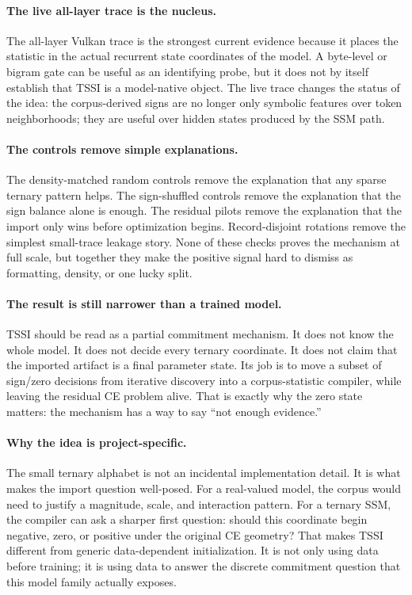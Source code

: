 \documentclass{article}
\begin{document}
\paragraph{The live all-layer trace is the nucleus.}
The all-layer Vulkan trace is the strongest current evidence because it places
the statistic in the actual recurrent state coordinates of the model. A
byte-level or bigram gate can be useful as an identifying probe, but it does not
by itself establish that TSSI is a model-native object. The live trace changes
the status of the idea: the corpus-derived signs are no longer only symbolic
features over token neighborhoods; they are useful over hidden states produced
by the SSM path.

\paragraph{The controls remove simple explanations.}
The density-matched random controls remove the explanation that any sparse
ternary pattern helps. The sign-shuffled controls remove the explanation that
the sign balance alone is enough. The residual pilots remove the explanation
that the import only wins before optimization begins. Record-disjoint rotations
remove the simplest small-trace leakage story. None of these checks proves the
mechanism at full scale, but together they make the positive signal hard to
dismiss as formatting, density, or one lucky split.

\paragraph{The result is still narrower than a trained model.}
TSSI should be read as a partial commitment mechanism. It does not know the
whole model. It does not decide every ternary coordinate. It does not claim that
the imported artifact is a final parameter state. Its job is to move a subset
of sign/zero decisions from iterative discovery into a corpus-statistic
compiler, while leaving the residual CE problem alive. That is exactly why the
zero state matters: the mechanism has a way to say ``not enough evidence.''

\paragraph{Why the idea is project-specific.}
The small ternary alphabet is not an incidental implementation detail. It is
what makes the import question well-posed. For a real-valued model, the corpus
would need to justify a magnitude, scale, and interaction pattern. For a
ternary SSM, the compiler can ask a sharper first question: should this
coordinate begin negative, zero, or positive under the original CE geometry?
That makes TSSI different from generic data-dependent initialization. It is not
only using data before training; it is using data to answer the discrete
commitment question that this model family actually exposes.
\end{document}
